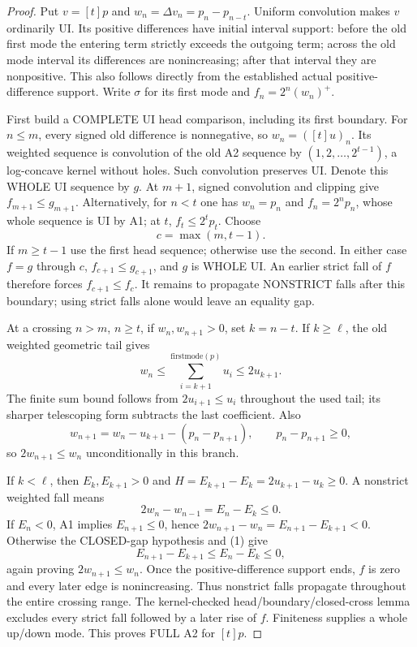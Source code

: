 \begin{proof}
Put $v=[t]p$ and $w_n=\Delta v_n=p_n-p_{n-t}$. Uniform convolution
makes $v$ ordinarily UI. Its positive differences have initial interval
support: before the old first mode the entering term strictly exceeds
the outgoing term; across the old mode interval its differences are
nonincreasing; after that interval they are nonpositive. This also
follows directly from the established actual positive-difference support.
Write $\sigma$ for its first mode and $f_n=2^n(w_n)^+$.

First build a COMPLETE UI head comparison, including its first boundary.
For $n\le m$, every signed old difference is nonnegative, so
$w_n=([t]u)_n$. Its weighted sequence is convolution of the old A2
sequence by $(1,2,\ldots,2^{t-1})$, a log-concave kernel without holes.
Such convolution preserves UI. Denote this WHOLE UI sequence by $g$.
At $m+1$, signed convolution and clipping give $f_{m+1}\le g_{m+1}$.
Alternatively, for $n<t$ one has $w_n=p_n$ and $f_n=2^np_n$,
whose whole sequence is UI by A1; at $t$, $f_t\le2^tp_t$.
Choose
\[
                         c=\max(m,t-1).
\]
If $m\ge t-1$ use the first head sequence; otherwise use the second.
In either case $f=g$ through $c$, $f_{c+1}\le g_{c+1}$, and $g$ is
WHOLE UI. An earlier strict fall of $f$ therefore forces
$f_{c+1}\le f_c$. It remains to propagate NONSTRICT falls after this
boundary; using strict falls alone would leave an equality gap.

At a crossing $n>m$, $n\ge t$, if $w_n,w_{n+1}>0$, set $k=n-t$.
If $k\ge\ell$, the old weighted geometric tail gives
\[
 w_n\le\sum_{i=k+1}^{\mathrm{firstmode}(p)}u_i\le2u_{k+1}.
\]
The finite sum bound follows from $2u_{i+1}\le u_i$ throughout the
used tail; its sharper telescoping form subtracts the last coefficient.
Also
\[
 w_{n+1}=w_n-u_{k+1}-(p_n-p_{n+1}),\qquad p_n-p_{n+1}\ge0,
\]
so $2w_{n+1}\le w_n$ unconditionally in this branch.

If $k<\ell$, then $E_k,E_{k+1}>0$ and
$H=E_{k+1}-E_k=2u_{k+1}-u_k\ge0$. A nonstrict weighted fall means
\[
          2w_n-w_{n-1}=E_n-E_k\le0.                    \tag{1}
\]
If $E_n<0$, A1 implies $E_{n+1}\le0$, hence
$2w_{n+1}-w_n=E_{n+1}-E_{k+1}<0$.
Otherwise the CLOSED-gap hypothesis and (1) give
\[
 E_{n+1}-E_{k+1}\le E_n-E_k\le0,
\]
again proving $2w_{n+1}\le w_n$. Once the positive-difference support
ends, $f$ is zero and every later edge is nonincreasing.
Thus nonstrict falls propagate throughout the entire crossing range.
The kernel-checked head/boundary/closed-cross lemma excludes every
strict fall followed by a later rise of $f$. Finiteness supplies a
whole up/down mode. This proves FULL A2 for $[t]p$.
\end{proof}

